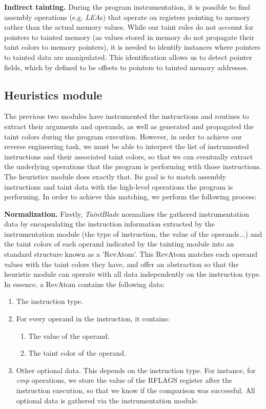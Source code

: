 \documentclass[conference]{IEEEtran}
\begin{document}
\textbf{Indirect tainting.}
During the program instrumentation, it is possible to find assembly operations (e.g. \textit{LEA}s) 
that operate on registers pointing to memory rather than the actual memory values.
While our taint rules do not account for pointers to tainted memory (as values stored in memory do 
not propagate their taint colors to memory pointers), it is needed to identify instances where
pointers to tainted data are manipulated. This identification allows us to detect pointer fields,
which by defined to be offsets to pointers to tainted memory addresses.

\subsection{Heuristics module}
The previous two modules have instrumented the instructions and routines to
extract their arguments and operands, as well as generated and propagated the
taint colors during the program execution. However, in order to achieve our reverse
engineering task, we must be able to interpret the list of instrumented
instructions and their associated taint colors, so that we can eventually
extract the underlying operations that the program is performing with those
instructions. The heuristics module does exactly that. Its goal is to match
assembly instructions and taint data with the high-level operations the program
is performing. In order to achieve this matching, we perform the following process:

\textbf{Normalization.}
Firstly, \textit{TaintBlade} normalizes the gathered instrumentation data by encapsulating the instruction information
extracted by the instrumentation module (the type of instruction, the value of the operands...) and the
taint colors of each operand indicated by the tainting module into an standard structure known as a 'RevAtom'.
This RevAtom matches each operand values with the taint colors they have, and offer an abstraction
so that the heuristic module can operate with all data independently on the instruction type. In essence,
a RevAtom contains the following data:

\begin{enumerate}
    \item The instruction type.
    \item For every operand in the instruction, it contains:
          \begin{enumerate}
              \item The value of the operand.
              \item The taint color of the operand.
          \end{enumerate}
    \item Other optional data. This depends on the instruction type. For instance, for
          \textit{cmp} operations, we store the value of the RFLAGS register after the
          instruction execution, so that we know if the comparison was successful. All
          optional data is gathered via the instrumentation module.
\end{enumerate}
\end{document}
